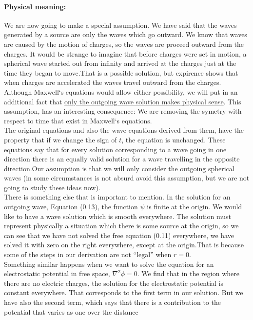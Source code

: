 \documentclass[paper=a4, fontsize=11pt]{scrartcl} %
\numberwithin{equation}{section} %
\numberwithin{figure}{section} %
\numberwithin{table}{section} %
\begin{document}
\paragraph*{Physical meaning:}
We are now  going to make a special assumption. We have said that the waves generated by a source are only the waves which go outward. We know that
waves are caused by the motion of charges, so the waves are proceed outward from the charges. It would be strange to imagine that before charges 
were set in motion, a spherical wave started out from infinity and arrived at the charges just at the time they began to move.That is a possible solution,
but expirence shows that when charges are accelerated the waves travel outward from the charges.\\
Although Maxwell`s equations would allow either possibility, we will put in an additional fact that \underline{only the outgoing wave solution makes physical sense}.
This assumption, has an interesting consequence: We are removing the symetry with respect to time that exist in Maxwell`s equations.\\
The original equations and also the wave equations derived from them, have the property that if we change the sign of $t$, the equation is unchanged.
These equations say that for every solution corresponding to a wave going in one direction there is an equally valid solution for a wave travelling
in the opposite direction.Our assumption is that we will only consider the outgoing spherical waves (in some circumstances is not absurd avoid this assumption, but
we are not going to study these ideas now).\\
There is something else that is important to mention. In the solution for an outgoing wave, Equation (0.13), the function $\psi$ is finite at the origin.
We would like to have a wave solution which is smooth everywhere. The solution must represent physically a situation which there is some source
at the origin, so we can see that we have not solved the free equation (0.11) everywhere, we have solved it with zero on the right everywhere, except
at the origin.That is because some of the steps in our derivation are not ``legal'' when $r=0$.\\
Something similar happens when we want to solve the equation for an electrostatic potential in free space, $\nabla^2\phi=0$. We find that in the region
where there are no electric charges, the solution for the electrostatic potential is constant everywhere. That corresponds to the first
term in our solution. But we have also the second term, which says that there is a  contribution to the potential that varies as one over the distance
\end{document}
